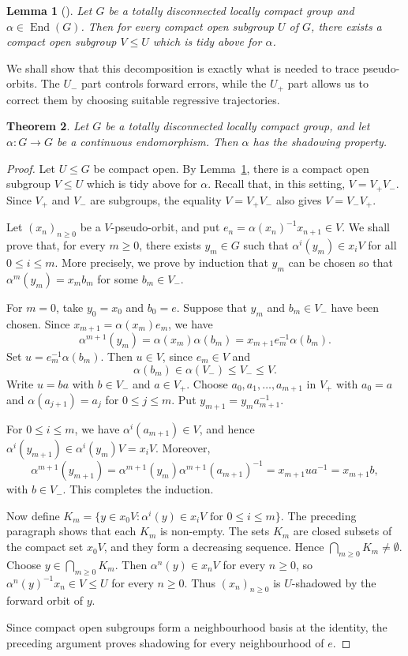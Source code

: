 \documentclass[12pt]{amsart}
\newtheorem{theorem}{Theorem}[section]
\newtheorem{lemma}[theorem]{Lemma}
\theoremstyle{definition}
\numberwithin{equation}{section}
\theoremstyle{remark}
\begin{document}
\begin{lemma}[{\cite[Proposition~3.9]{WillisEndomorphisms}}]\label{tabase}
Let $G$ be a totally disconnected locally compact group and
$\alpha\in\operatorname{End}(G)$. Then
for every compact open subgroup $U$ of $G$, there exists a compact open
subgroup $V\leq U$ which is tidy above for $\alpha$.
\end{lemma}

We shall show that this decomposition is exactly what is needed to trace
pseudo-orbits. The $U_-$ part controls forward errors, while the $U_+$ part
allows us to correct them by choosing suitable regressive trajectories.



\begin{theorem}\label{Th:tdlc}
Let $G$ be a totally disconnected locally compact group, and let
$\alpha:G\to G$ be a continuous endomorphism. Then $\alpha$ has the
shadowing property.
\end{theorem}

\begin{proof} 
Let $U\leq G$ be compact open. By Lemma~\ref{tabase}, there is a compact
open subgroup $V\leq U$ which is
tidy above for $\alpha$. Recall that, in this setting,
$V=V_+V_-$. Since $V_+$ and $V_-$ are subgroups, the equality $V=V_+V_-$ also gives
$V=V_-V_+$.

Let $(x_n)_{n\geq 0}$ be a $V$-pseudo-orbit, and put
$e_n=\alpha(x_n)^{-1}x_{n+1}\in V$. We shall prove that, for every
$m\geq 0$, there exists $y_m\in G$ such that
$\alpha^i(y_m)\in x_iV$ for all $0\leq i\leq m$. More precisely, we prove
by induction that $y_m$ can be chosen so that
$\alpha^m(y_m)=x_mb_m$ for some $b_m\in V_-$.

For $m=0$, take $y_0=x_0$ and $b_0=e$. Suppose that $y_m$ and
$b_m\in V_-$ have been chosen. Since $x_{m+1}=\alpha(x_m)e_m$, we have
\[
\alpha^{m+1}(y_m)=\alpha(x_m)\alpha(b_m)
=x_{m+1}e_m^{-1}\alpha(b_m).
\]
Set $u=e_m^{-1}\alpha(b_m)$. Then $u\in V$, since $e_m\in V$ and
\[
\alpha(b_m)\in \alpha(V_-)\leq V_-\leq V.
\] 
Write $u=ba$ with $b\in V_-$ and
$a\in V_+$. Choose
$a_0,a_1,\ldots,a_{m+1}$ in $V_+$ with $a_0=a$ and
$\alpha(a_{j+1})=a_j$ for $0\leq j\leq m$. Put 
$y_{m+1}=y_ma_{m+1}^{-1}$.

For $0\leq i\leq m$, we have $\alpha^i(a_{m+1})\in V$, and hence
$\alpha^i(y_{m+1})\in \alpha^i(y_m)V=x_i V$. Moreover,
\[
\alpha^{m+1}(y_{m+1})
=\alpha^{m+1}(y_m)\alpha^{m+1}(a_{m+1})^{-1}
=x_{m+1}ua^{-1}=x_{m+1}b,
\]
with $b\in V_-$. This completes the induction.

Now define
$K_m=\{y\in x_0V:\alpha^i(y)\in x_iV\text{ for }0\leq i\leq m\}$.
The preceding paragraph shows that each $K_m$ is non-empty. The sets $K_m$
are closed subsets of the compact set $x_0V$, and they form a decreasing
sequence. Hence $\bigcap_{m\geq 0}K_m\neq\emptyset$. Choose
$y\in\bigcap_{m\geq 0}K_m$. Then $\alpha^n(y)\in x_nV$ for every
$n\geq 0$, so $\alpha^n(y)^{-1}x_n\in V\leq U$ for every $n\geq 0$.
Thus $(x_n)_{n\geq 0}$ is $U$-shadowed by the forward orbit of $y$.

Since compact open subgroups form a neighbourhood basis at the identity,
the preceding argument proves shadowing for every neighbourhood of $e$.
\end{proof}
\end{document}
